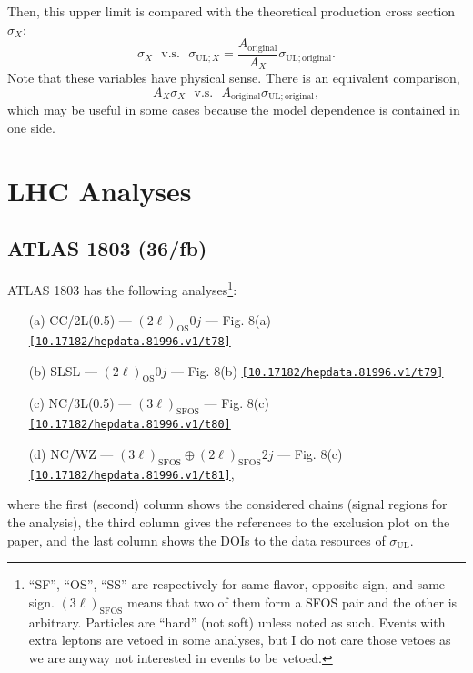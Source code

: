 \documentclass[a4paper,10pt,captions=tableheading,DIV=14]{scrartcl}
\numberwithin{equation}{section}
\newcommand\w[1]{_{\mathrm{#1}}}
\newcommand\doi[1]{{\footnotesize \texttt{\href{https://doi.org/#1}{[#1]}}}}
\begin{document}
Then, this upper limit is compared with the theoretical production cross section $\sigma_X$:
\begin{equation}
 \sigma_X \text{~~v.s.~~} \sigma_{\mathrm{UL};X}=\frac{A\w{original}}{A_X}\sigma\w{UL;original}.
\end{equation}
Note that these variables have physical sense.
There is an equivalent comparison,
\begin{equation}
 A_X \sigma_X \text{~~v.s.~~} A\w{original}\sigma\w{UL;original},
\end{equation}
which may be useful in some cases because the model dependence is contained in one side.




\section{LHC Analyses}
\subsection{ATLAS 1803 (36/fb)}
ATLAS 1803\cite{1803.02762} has the following analyses\footnote{``SF'', ``OS'', ``SS'' are respectively for same flavor, opposite sign, and same sign. $(3\ell)\w{SFOS}$ means that two of them form a SFOS pair and the other is arbitrary. Particles are ``hard'' (not soft) unless noted as such. Events with extra leptons are vetoed in some analyses, but I do not care those vetoes as we are anyway not interested in events to be vetoed.}:
\begin{itemize}
 \item[(a)] CC/2L(0.5) --- $(2\ell)\w{OS}0j$ --- Fig. 8(a) \doi{10.17182/hepdata.81996.v1/t78}
 \item[(b)] SLSL       --- $(2\ell)\w{OS}0j$ --- Fig. 8(b) \doi{10.17182/hepdata.81996.v1/t79}
 \item[(c)] NC/3L(0.5) --- $(3\ell)\w{SFOS}$  --- Fig. 8(c) \doi{10.17182/hepdata.81996.v1/t80}
 \item[(d)] NC/WZ      --- $(3\ell)\w{SFOS}\oplus(2\ell)\w{SFOS}2j$  --- Fig. 8(c) \doi{10.17182/hepdata.81996.v1/t81},
\end{itemize}
where the first (second) column shows the considered chains (signal regions for the analysis), the third column gives the references to the exclusion plot on the paper, and the last column shows the DOIs to the data resources of $\sigma\w{UL}$.
\end{document}
